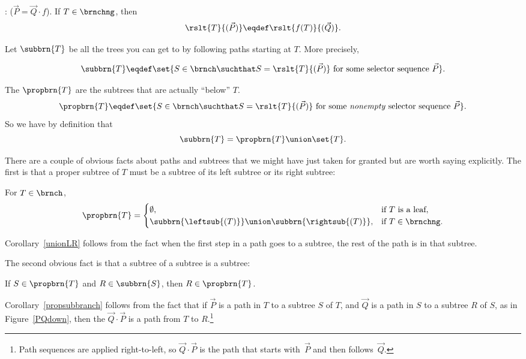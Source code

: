 \begin{definition}
\begin{definition}
{: ($\vec{P} = \vec{Q} \cdot f$).  If
$T \in \brnchng$, then
\[
\rslt{T}{(\vec{P})} \eqdef \rslt{f(T)}{(\vec{Q})}.
\]}

\end{definition}
\medskip

Let $\subbrn{T}$ be all the trees you can get to by following paths
starting at $T$.  More precisely,
\begin{definition}\label{def:subtree}
\[
\subbrn{T} \eqdef \set{S \in \brnch \suchthat S =
  \rslt{T}{(\vec{P})}\ \text{for some selector sequence}\ \vec{P}}.
\]
\end{definition}

The  $\propbrn{T}$ are the subtrees that are
actually ``below'' $T$.
\[
\propbrn{T} \eqdef \set{S \in \brnch \suchthat S =
  \rslt{T}{(\vec{P})}\ \text{for some \emph{nonempty} selector
    sequence}\ \vec{P}}.
\]
So we have by definition that
\begin{equation}\label{subtree-proptree}
\subbrn{T} = \propbrn{T} \union \set{T}.
\end{equation}

There are a couple of obvious facts about paths and subtrees that we
might have just taken for granted but are worth saying explicitly.
The first is that a proper subtree of $T$ must be a subtree of its
left subtree or its right subtree:

\begin{corollary}\label{unionLR}
For $T \in \brnch$,
\[
\propbrn{T} =
\begin{cases}
  \emptyset, & \text{if $T$ is a leaf},\\
  \subbrn{\leftsub{(T)}} \union \subbrn{\rightsub{(T)}},
            & \text{if}\ T \in \brnchng.
\end{cases}
\]
\end{corollary}

Corollary~\ref{unionLR} follows from the fact when the first step in a
path goes to a subtree, the rest of the path is in that subtree.

The second obvious fact is that a subtree of a subtree is a subtree:

\begin{corollary}\label{propsubbranch}
If  $S \in \propbrn{T}$ and $R \in \subbrn{S}$, then $R \in \propbrn{T}$.
\end{corollary}

Corollary~\ref{propsubbranch} follows from the fact that if $\vec{P}$
is a path in $T$ to a subtree $S$ of $T$, and $\vec{Q}$ is a path in
$S$ to a subtree $R$ of $S$, as in Figure~\ref{PQdown}, then the
 $\vec{Q} \cdot \vec{P}$ is a path from $T$ to
$R$.\footnote{Path sequences are applied right-to-left, so $\vec{Q}
  \cdot \vec{P}$ is the path that starts with~$\vec{P}$ and then
  follows~$\vec{Q}$.}


\end{definition}
